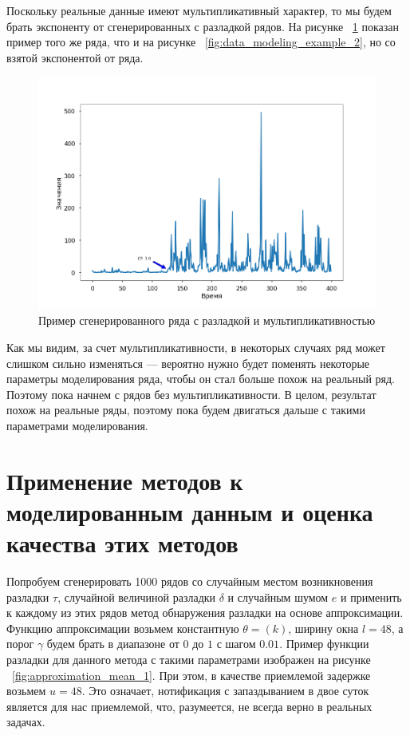 \documentclass[%
12pt,
master,  %
natbib,      %
subf,        %
substylefile = spbu.rtx,
href,        %
colorlinks,  %
]{disser}
\begin{document}
Поскольку реальные данные имеют мультипликативный характер, то мы будем брать экспоненту от сгенерированных с разладкой рядов. На рисунке ~\ref{fig:data_modeling_example_3} показан пример того же ряда, что и на рисунке ~\ref{fig:data_modeling_example_2}, но со взятой экспонентой от ряда.

\begin{figure}[!hhh]
	\begin{center}
		\includegraphics[width=12cm]{data_modeling_example_3}
	\end{center}
	\vspace{-5mm}\caption{Пример сгенерированного ряда с разладкой и мультипликативностью}
	\label{fig:data_modeling_example_3}
\end{figure}

Как мы видим, за счет мультипликативности, в некоторых случаях ряд может слишком сильно изменяться --- вероятно нужно будет поменять некоторые параметры моделирования ряда, чтобы он стал больше похож на реальный ряд. Поэтому пока начнем с рядов без мультипликативности. В целом, результат похож на реальные ряды, поэтому пока будем двигаться дальше с такими параметрами моделирования.



\section{Применение методов к моделированным данным и оценка качества этих методов}

Попробуем сгенерировать 1000 рядов со случайным местом возникновения разладки $\tau$, случайной величиной разладки $\delta$ и случайным шумом $e$ и применить к каждому из этих рядов метод обнаружения разладки на основе аппроксимации. Функцию аппроксимации возьмем константную $\theta = (k)$, ширину окна $l = 48$, а порог $\gamma$ будем брать в диапазоне от $0$ до $1$ с шагом $0.01$. Пример функции разладки для данного метода с такими параметрами изображен на рисунке  ~\ref{fig:approximation_mean_1}. При этом, в качестве приемлемой задержке возьмем $u = 48$. Это означает, нотификация с запаздыванием в двое суток является для нас приемлемой, что, разумеется, не всегда верно в реальных задачах.
\end{document}
